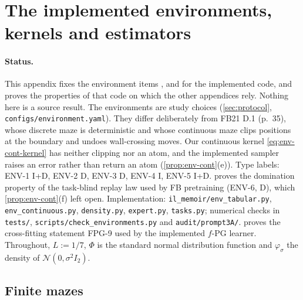 \section{The implemented environments, kernels and estimators}\label{sec:env}

\providecommand{\cW}{\mathcal W}
\providecommand{\cB}{\mathcal B}
\providecommand{\Leb}{\lambda}

\paragraph{Status.}
This appendix fixes the environment items ,  and  for the implemented code, and proves the properties of that code on which the other appendices rely.
Nothing here is a source result.
The environments are study choices (\cref{sec:protocol}, \texttt{configs/environment.yaml}).
They differ deliberately from FB21 D.1 (p.~35), whose discrete maze is deterministic and whose continuous maze clips positions at the boundary and undoes wall-crossing moves.
Our continuous kernel \eqref{eq:env-cont-kernel} has neither clipping nor an atom, and the implemented sampler raises an error rather than return an atom (\cref{prop:env-cont}(e)).
Type labels: ENV-1 \textsf{I+D}, ENV-2 \textsf{D}, ENV-3 \textsf{D}, ENV-4 \textsf{I}, ENV-5 \textsf{I+D}.
 proves the domination property of the task-blind replay law used by FB pretraining (ENV-6, \textsf{D}), which \cref{prop:env-cont}(f) left open.
Implementation: \texttt{il\_memoir/env\_tabular.py}, \texttt{env\_continuous.py}, \texttt{density.py}, \texttt{expert.py}, \texttt{tasks.py}; numerical checks in \texttt{tests/}, \texttt{scripts/check\_environments.py} and \texttt{audit/prompt3A/}.  proves the cross-fitting statement FPG-9 used by the implemented $f$-PG learner.
Throughout, $L:=1/7$, $\Phi$ is the standard normal distribution function and $\varphi_\sigma$ the density of $\mathcal N(0,\sigma^2I_2)$.

\subsection{Finite mazes}\label{sec:env-finite}


